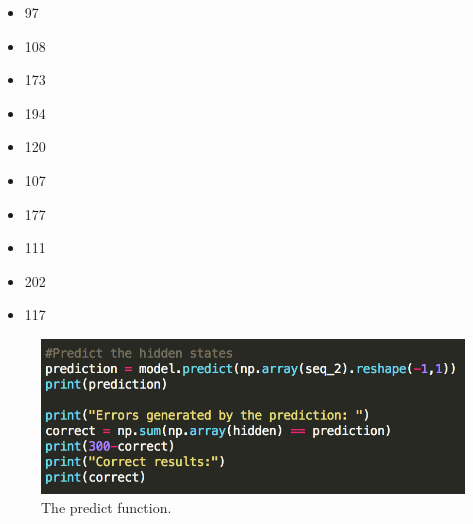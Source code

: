 \documentclass[12pt, letter]{article}
\begin{document}
\begin{itemize}
\item 97
\item 108
\item 173
\item 194
\item 120
\item 107
\item 177
\item 111
\item 202
\item 117
\end{itemize}

 \begin{figure}[htb]
  \centering
  \includegraphics[width=0.70 \textwidth]{./figures/predict.png}
  \caption{The predict function.}
\end{figure}
\end{document}
